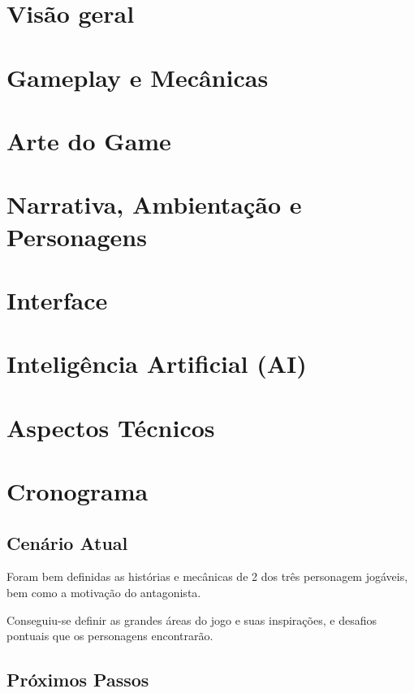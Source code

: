 \chapter{Visão geral}


\chapter{Gameplay e Mecânicas}


\chapter{Arte do Game}


\chapter{Narrativa, Ambientação e Personagens}


\chapter{Interface}


\chapter{Inteligência Artificial (AI)}


\chapter{Aspectos Técnicos}


\chapter{Cronograma}

\section{Cenário Atual}

Foram bem definidas as histórias e mecânicas de 2 dos três personagem jogáveis, bem como a motivação do antagonista.

Conseguiu-se definir as grandes áreas do jogo e suas inspirações, e desafios pontuais que os personagens encontrarão.

\section{Próximos Passos}

